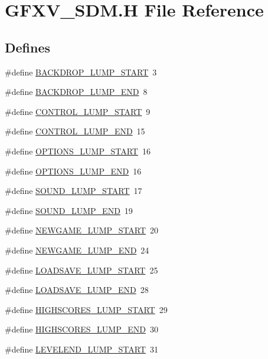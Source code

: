 \hypertarget{GFXV__SDM_8H}{
\section{GFXV\_\-SDM.H File Reference}
\label{GFXV__SDM_8H}
}
\subsection*{Defines}
\begin{DoxyCompactItemize}
\item 
\#define \hyperlink{GFXV__SDM_8H_adca5aa22f771fbd057c3a4356d982fb7}{BACKDROP\_\-LUMP\_\-START}~3
\item 
\#define \hyperlink{GFXV__SDM_8H_a68a24fd26f7eabc37dc80033e5872347}{BACKDROP\_\-LUMP\_\-END}~8
\item 
\#define \hyperlink{GFXV__SDM_8H_a75ff432d9ba8b9fe543c629b2a83f7fc}{CONTROL\_\-LUMP\_\-START}~9
\item 
\#define \hyperlink{GFXV__SDM_8H_ae6b5809ca4fa11ac02d20e267ad8b089}{CONTROL\_\-LUMP\_\-END}~15
\item 
\#define \hyperlink{GFXV__SDM_8H_ae9292998e373edbc6fc0fdb546f74657}{OPTIONS\_\-LUMP\_\-START}~16
\item 
\#define \hyperlink{GFXV__SDM_8H_ad3d257cd7112ba25f592d70faa282c03}{OPTIONS\_\-LUMP\_\-END}~16
\item 
\#define \hyperlink{GFXV__SDM_8H_a08adf27ac9c0ad4e9ebcfe26fef4b598}{SOUND\_\-LUMP\_\-START}~17
\item 
\#define \hyperlink{GFXV__SDM_8H_a37bad6ec4f5f567283a14469c99417d1}{SOUND\_\-LUMP\_\-END}~19
\item 
\#define \hyperlink{GFXV__SDM_8H_abb2bb967376d31f82376d5656dc3e054}{NEWGAME\_\-LUMP\_\-START}~20
\item 
\#define \hyperlink{GFXV__SDM_8H_ad8ccaab82ba48373db06f8accb144590}{NEWGAME\_\-LUMP\_\-END}~24
\item 
\#define \hyperlink{GFXV__SDM_8H_a8ec21621aee0ac9bcb1d3cb51a0c64af}{LOADSAVE\_\-LUMP\_\-START}~25
\item 
\#define \hyperlink{GFXV__SDM_8H_af3437d258aae461ec5bbc643949f15ba}{LOADSAVE\_\-LUMP\_\-END}~28
\item 
\#define \hyperlink{GFXV__SDM_8H_a1dc771ff501b4ccc5ac56b659b8006db}{HIGHSCORES\_\-LUMP\_\-START}~29
\item 
\#define \hyperlink{GFXV__SDM_8H_ae83c660f8b0c218c7c7a502da844f235}{HIGHSCORES\_\-LUMP\_\-END}~30
\item 
\#define \hyperlink{GFXV__SDM_8H_a1895eb960cb12bb7b49bf322e79d6c80}{LEVELEND\_\-LUMP\_\-START}~31

\end{DoxyCompactItemize}

